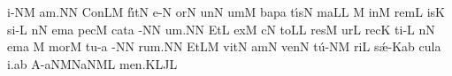 \sgn {}i-\clivis NM\egn
\sgn {}a{m.}\punctum N\augmentum N\egn
\spatium
\divisiofinalis
\spatium
\sgn Con\pes LM\egn
\sgn f{\'\i}t\punctum N\egn
\sgn {}e-\punctum N\egn
\sgn {}or\punctum N\egn
\spatium
\sgn {}un\punctum N\egn
\sgn {}um\punctum M\egn
\spatium
\sgn bap\punctum a\egn
\sgn t{\'\i}s\punctum N\egn
\sgn ma{}\punctum L\augmentum L\egn
\spatium
\divisiominima
\spatium
\custos M
\lineaproxima
\sgn {}in\punctum M\egn
\spatium
\sgn rem\punctum L\egn
\sgn {}is\punctum K\egn
\sgn si-\punctum L\egn
{}n\punctum N\egn
\sgn {}em\punctum a\egn
\spatium
\sgn pec\punctum M\egn
\sgn cat\punctum a\egn
{}-\punctum N\augmentum N\egn
{}u{m.}\punctum N\augmentum N\egn
\spatium
\divisiofinalis
\spatium
\sgn {}Et\punctum L\egn
\spatium
\sgn {}ex\punctum M\egn
{}c\punctum N\egn
\sgn to{}\punctum L\augmentum L\egn
\spatium
\sgn res\punctum M\egn
\sgn {}ur\punctum L\egn
\sgn rec\punctum K\egn
\sgn ti-\punctum L\egn
{}n\punctum N\egn
\sgn {}em\punctum a\egn
\spatium
\custos M
\lineaproxima
\sgn mor\punctum M\egn
\sgn tu-\punctum a\egn
{}-\punctum N\augmentum N\egn
\sgn ru{m.}\punctum N\augmentum N\egn
\spatium
\divisiofinalis
\spatium
\sgn {}Et\pes LM\egn
\spatium
\sgn v{i}t\punctum N\egn
\sgn {}am\punctum N\egn
\spatium
\sgn ven\punctum N\egn
\sgn t{\'u}-\clivis NM\egn
\sgn ri{}\punctum L\egn
\spatium
\sgn s{\'\ae}-\scandicus Kab\egn
\sgn cul\punctum a\egn
\sgn {}i.\punctum a\augmentum b\egn
\spatium
\divisiofinalis
\spatium
\sgn {}A-\climacus aNM\pessubbipunctis NaNM\nonspatium\punctuminclinatum L\egn
\sgn me{n.}\pes KL\augmentumduplex JL\egn
\spatium
\endgroup
\Finisgregoriana

